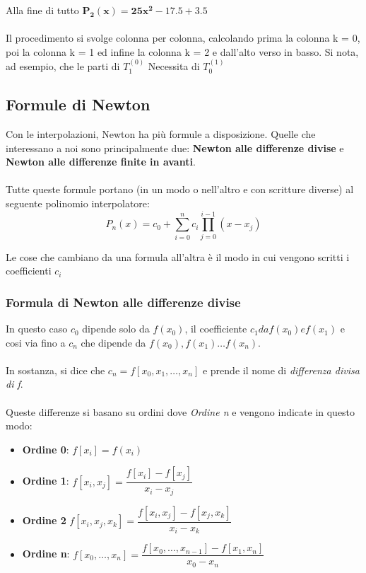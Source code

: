 Alla fine di tutto $\boldsymbol{P_2(x) = 25x^2-17.5+3.5}$
\\ \\ 
Il procedimento si svolge colonna per colonna, calcolando prima la colonna k = 0, poi la colonna k = 1 ed infine la colonna k = 2 e dall'alto verso in basso. Si nota, ad esempio, che le parti di $T_1^(0)$ Necessita di $T_0^{(1)}$

\subsection{Formule di Newton}
\label{Formule di Newton}
Con le interpolazioni, Newton ha più formule a disposizione. Quelle che interessano a noi sono principalmente due: \textbf{Newton alle differenze divise} e \textbf{Newton alle differenze finite in avanti}.
\\
\\
\noindent Tutte queste formule portano (in un modo o nell'altro e con scritture diverse) al seguente polinomio interpolatore: $$P_n(x) = c_0 + \sum_{i=0}^{n} c_i \prod_{j=0}^{i-1}(x-x_j)$$

Le cose che cambiano da una formula all'altra è il modo in cui vengono scritti i coefficienti $c_i$

\subsubsection{Formula di Newton alle differenze divise}
\label{Formula di Newton alle differenze divise}
In questo caso $c_0$ dipende solo da $f(x_0)$, il coefficiente $c_1 da f(x_0) e f(x_1)$ e cosi via fino a $c_n$ che dipende da $f(x_0),f(x_1)\dots f(x_n)$.
\\ \\
In sostanza, si dice che $c_n = f[x_0,x_1,\dots ,x_n]$
e prende il nome di \textit{differenza divisa di f}. \\ \\
\noindent Queste differenze si basano su ordini dove \textit{Ordine n} e vengono indicate in questo modo:
\begin{itemize}
\item \textbf{Ordine 0}: $f[x_i] = f(x_i)$
\item \textbf{Ordine 1}: $f[x_i,x_j] = \dfrac{f[x_i] - f[x_j]}{x_i-x_j}$
\item \textbf{Ordine 2} $f[x_i,x_j,x_k] = \dfrac{f[x_i,x_j] - f[x_j,x_k]}{x_i-x_k}$
\item \textbf{Ordine n}: $f[x_0,\dots ,x_n] = \dfrac{f[x_0,\dots ,x_{n-1}] - f[x_1,x_n]}{x_0-x_n}$
\end{itemize}

